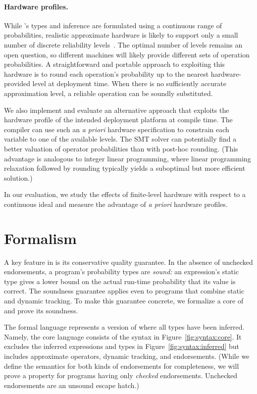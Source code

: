 {\paragraph{Hardware profiles.}

While \lang's types and inference are formulated using a continuous range of
probabilities, realistic approximate hardware is likely to support only a
small number of discrete reliability levels~\cite{truffle, quora}.
The optimal number of levels remains an open question, so different machines
will likely provide different sets of operation probabilities.
A straightforward and portable approach to exploiting this hardware is to
round each operation's probability up to the nearest hardware-provided level
at deployment time.
When there is no sufficiently accurate approximation level, a reliable
operation can be soundly substituted.

We also implement and evaluate an alternative approach that exploits the
hardware profile of the intended deployment platform at compile time.
The compiler can use such an \emph{a priori} hardware specification to
constrain each variable to one of the available levels.
The SMT solver can potentially find a better valuation of operator
probabilities than with post-hoc rounding.
(This advantage is analogous to integer linear programming, where linear
programming relaxation followed by rounding typically yields a suboptimal but
more efficient solution.)

In our evaluation, we study the effects of finite-level hardware with respect
to a continuous ideal and measure the advantage of \emph{a priori} hardware
profiles.


\section{Formalism}
\label{sec:semantics}

A key feature in \lang is its conservative quality guarantee.
In the absence of unchecked endorsements, a \lang program's probability types
are \emph{sound:} an expression's static type gives a lower bound on the actual
run-time probability that its value is correct.
The soundness guarantee applies
even to programs that combine static and dynamic tracking.
To make this guarantee concrete, we formalize a core of \lang and prove its
soundness.

The formal language represents a version of \lang where all types have been
inferred.
Namely, the core language consists of the syntax in
Figure~\ref{fig:syntax:core}.
It excludes the inferred expressions and types in
Figure~\ref{fig:syntax:inferred} but
includes approximate operators, dynamic tracking, and endorsements.
(While we define the semantics for both kinds of endorsements for
completeness, we will prove a property for programs having only \emph{checked}
endorsements. Unchecked endorsements are an unsound escape hatch.)

}
